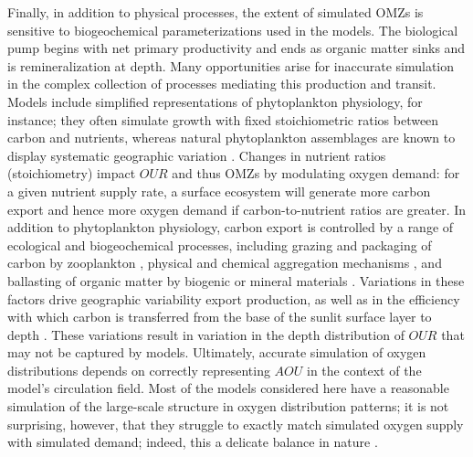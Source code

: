 \documentclass{report_chapter}
\begin{document}
Finally, in addition to physical processes, the extent of simulated OMZs is sensitive to biogeochemical parameterizations used in the models.
The biological pump begins with net primary productivity and ends as organic matter sinks and is remineralization at depth.
Many opportunities arise for inaccurate simulation in the complex collection of processes mediating this production and transit.
Models include simplified representations of phytoplankton physiology, for instance; they often simulate growth with fixed stoichiometric ratios between carbon and nutrients, whereas natural phytoplankton assemblages are known to display systematic geographic variation \citep{Devries-Deutsch-2014}.
Changes in nutrient ratios (stoichiometry) impact $OUR$ and thus OMZs by modulating oxygen demand: for a given nutrient supply rate, a surface ecosystem will generate more carbon export and hence more oxygen demand if carbon-to-nutrient ratios are greater.
In addition to phytoplankton physiology, carbon export is controlled by a range of ecological and biogeochemical processes, including grazing and packaging of carbon by zooplankton \citep[e.g.,][]{Wilson-Steinberg-2010}, physical and chemical aggregation mechanisms \citep{Passow-2002,Burd-Jackson-2009}, and ballasting of organic matter by biogenic or mineral materials \citep{Armstrong-Lee-etal-2002,Klaas-Archer-2002}.
Variations in these factors drive geographic variability export production, as well as in the efficiency with which carbon is transferred from the base of the sunlit surface layer to depth \citep{Buesseler-Boyd-2009,Weber-Cram-etal-2016}. These variations result in variation in the depth distribution of $OUR$ that may not be captured by models.
Ultimately, accurate simulation of oxygen distributions depends on correctly representing $AOU$ in the context of the model's circulation field.
Most of the models considered here have a reasonable simulation of the large-scale structure in oxygen distribution patterns; it is not surprising, however, that they struggle to exactly match simulated oxygen supply with simulated demand; indeed, this a delicate balance in nature \citep{Watson-Lenton-etal-2017}.
\end{document}
